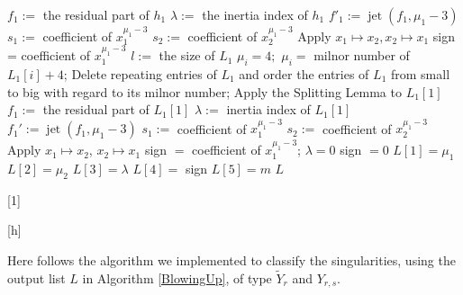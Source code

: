 \documentclass[noend]{amsproc}
\theoremstyle{definition}
\DeclareMathOperator{\jt}{jet}
\begin{document}
\begin{algorithm}[h]
\begin{algorithmic}[1]
\STATE $f_1:= $ the residual part of $h_1$
\STATE $\lambda:= $ the inertia index of $h_1$
\STATE $f'_1:=\jt(f_1,\mu_1-3)$
\STATE $s_1:=$ coefficient of $x_1^{\mu_1-3}$
\STATE $s_2:=$ coefficient of $x_2^{\mu_1-3}$
\STATE Apply $x_1\mapsto x_2, x_2\mapsto x_1$
\ENDIF
\STATE sign = coefficient of $x_1^{\mu_1-3}$
\ENDIF
\ENDFOR
{}
\STATE $l:=$ the size of $L_1$
\STATE $\mu_i=4;$
\ELSE
\STATE $\mu_i=$ milnor number of $L_1[i]+4$;\newline
\ENDIF
\ENDFOR
\STATE Delete repeating entries of $L_1$ and order the entries of
$L_1$ from small to
big with regard to its milnor number; \newline
{}
\STATE Apply the Splitting Lemma to $L_1[1]$
\STATE $f_1:=$ the residual part of $L_1[1]$
\STATE $\lambda:=$ inertia index of $L_1[1]$
\STATE $f_1':=\jt(f_1,\mu_1-3)$
\STATE $s_1:=$ coefficient of $x_1^{\mu_1-3}$
\STATE $s_2:=$ coefficient of $x_2^{\mu_1-3}$
\STATE Apply $x_1\mapsto x_2$, $x_2\mapsto x_1$
\ENDIF
\STATE sign $=$ coefficient of $x_1^{\mu_1-3}$;\newline
\ELSE
\STATE $\lambda = 0$
\STATE sign $=0$
\STATE $L[1]=\mu_1$
\STATE $L[2]=\mu_2$
\STATE $L[3]=\lambda$
\STATE $L[4]=$ sign
\STATE $L[5]=m$
\ENDIF
\ENDIF
\RETURN $L$

\end{algorithmic}[1]
\end{algorithm}[h]

Here follows the algorithm we implemented to classify the singularities, using
the output list $L$ in Algorithm \ref{BlowingUp}, of type $\widetilde Y_r$ and
$Y_{r,s}$.
\end{document}

